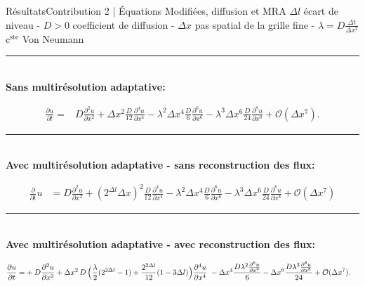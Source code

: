 
\begin{frame}{Résultats}{Contribution 2 | Équations Modifiées, diffusion et MRA}
    \centering\scriptsize$\Delta l$ écart de niveau - $D>0$ coefficient de diffusion - $\Delta x$ pas spatial de la grille fine - $\lambda = D \frac{\Delta t}{\Delta x^2}$ $\mathrm{c}^\mathrm{ste}$ Von Neumann\\\normalsize
    \noindent\color{Primary}\rule{\linewidth}{0.6pt}\color{black}\\
    \textbf{Sans multirésolution adaptative: }\\
    \begin{center}\footnotesize
        \begin{align}\label{eq:ref:cfl}
            \frac{\partial u}{\partial t}  =&D \frac{\partial^{2}u}{\partial x^{2}}
            + \Delta x^{2} \frac{D}{12}             \frac{\partial^{4}u}{\partial x^{4}} 
            - \lambda^2 \Delta  x^{4} \frac{D}{6}          \frac{\partial^{6}u}{\partial x^{6}} 
            - \lambda^3 \Delta x^{6} \frac{D}{24}        \frac{\partial^{8}u}{\partial x^{8}}  + \mathcal{O}(\Delta x^7).
        \end{align}
    \end{center}\pause
    \noindent\color{Primary}\rule{\linewidth}{0.6pt}\color{black}\\
    \textbf{Avec multirésolution adaptative - sans reconstruction des flux: }\\
        \begin{center}\footnotesize
            \begin{align}\label{eq:sansRecons:cfl}
            \frac{\partial}{\partial t} u&=
                D \frac{\partial^{2}u}{\partial x^{2}}
                + (2^{\Delta l} \Delta x)^{2}  \frac{D}{12} \frac{\partial^{4}u}{\partial x^{4}}
                -\lambda^2 \Delta x^{4} \frac{D}{6}   \frac{\partial^{6}u}{\partial x^{6}}
                -\lambda^3 \Delta x^{6} \frac{D}{24} \frac{\partial^{8}u}{\partial x^{8}} + \mathcal{O}(\Delta x^7)
    \end{align}
        \end{center}\pause
    \noindent\color{Primary}\rule{\linewidth}{0.6pt}\color{black}\\
    \textbf{Avec multirésolution adaptative - avec reconstruction des flux: }\\
        \begin{center}\scriptsize
        \begin{align}\label{eq:equiv_cfl_recons}
            \frac{\partial u}{\partial t}
            =&+ D \frac{\partial^{2}u}{\partial x^{2}}
            + \Delta x^{2}\, D \, \Bigl( 
            \frac{\lambda}{2} (2^{2 \Delta l} - 1) + \frac{2^{2 \Delta l} }{12} (1 - 3 \Delta l)
            \Bigr)\frac{\partial^{4}u}{\partial x^{4}}\
            - \Delta x^{4} \frac{D \lambda^{2} \frac{\partial^{6}u}{\partial x^{6}}}{6} - \Delta x^{6} \frac{D \lambda^{3} \frac{\partial^{8}u}{\partial x^{8}}}{24}
            + \mathcal{O}(\Delta x^7). 
        \end{align}

        \end{center}

\end{frame}